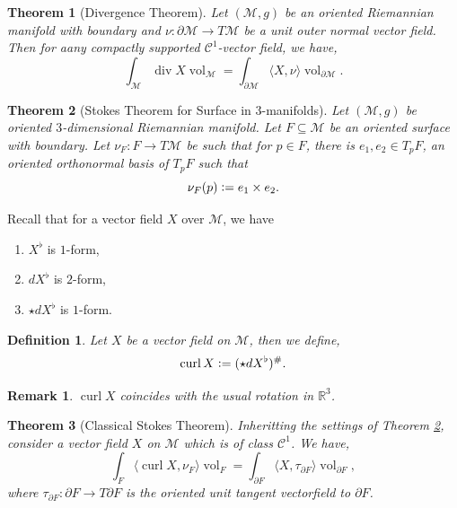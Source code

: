 \documentclass[10pt]{article}
\newtheorem{theorem}{Theorem} [section]
\newtheorem{definition}{Definition}[section]
\newtheorem{remark}{Remark}[section]
\DeclareMathOperator{\vol}{vol}
\DeclareMathOperator{\diverg}{div}
\DeclareMathOperator{\curl}{curl}
\newcommand{\defeq}{\vcentcolon=}
\newcommand{\R}[0]{\mathbb{R}}
\newcommand{\M}[0]{\mathcal{M}}
\begin{document}
\begin{theorem}[Divergence Theorem]
  \label{theorem_divergence}
  Let $(\M,g)$ be an oriented Riemannian manifold with boundary and $\nu:\partial\M\to T\M$ be a unit outer normal vector field. Then for aany compactly supported $\mathcal{C}^1$-vector field, we have, 
  \begin{equation*}
    \int_\M \diverg X\vol_\M = \int_{\partial\M}\langle X,\nu\rangle\vol_{\partial\M}.
  \end{equation*}
\end{theorem}

\begin{theorem}[Stokes Theorem for Surface in $3$-manifolds]
  Let $(\M,g)$ be oriented $3$-dimensional Riemannian manifold. Let $F\subseteq\M$ be an oriented surface with boundary.
  Let $\nu_F:F\to T\M$ be such that for $p\in F$, there is $e_1,e_2\in T_pF$, an oriented orthonormal basis of $T_pF$ such that 
  \begin{equation*}
    \nu_F(p)\defeq e_1\times e_2.
  \end{equation*}
  \label{theorem_stokes_surface}
\end{theorem}

Recall that for a vector field $X$ over $\M$, we have
\begin{enumerate}[1).]
  \item $X^\flat$ is $1$-form,
  \item $dX^\flat$ is $2$-form,
  \item $\star dX^\flat$ is $1$-form. 
\end{enumerate}

\begin{definition}
  Let $X$ be a vector field on $\M$, then we define,
  \begin{equation*}
    \curl X\defeq (\star dX^\flat)^\#.
  \end{equation*}
\end{definition}

\begin{remark}
  $\curl X$ coincides with the usual rotation in $\R^3$.
\end{remark}

\begin{theorem}[Classical Stokes Theorem]
  Inheritting the settings of Theorem \ref{theorem_stokes_surface}, consider a vector field $X$ on $\M$ which is of class $\mathcal{C}^1$. We have,
  \begin{equation*}
    \int_F\langle\curl X,\nu_F\rangle\vol_F = \int_{\partial F}\langle X,\tau_{\partial F}\rangle \vol_{\partial F},
  \end{equation*}
  where $\tau_{\partial F}:\partial F\to T\partial F$ is the oriented unit tangent vectorfield to $\partial F$.
\end{theorem}
\end{document}
